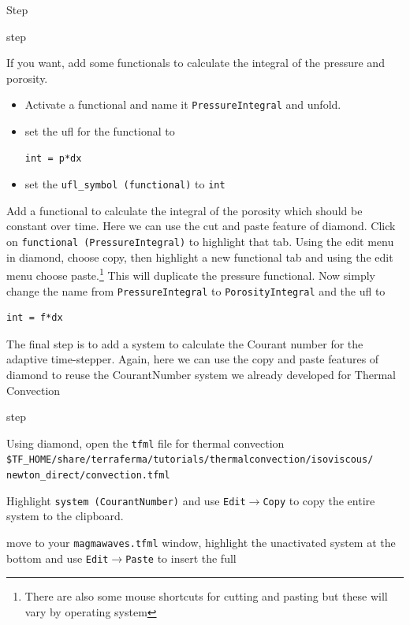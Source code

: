 \begin{steps}{Step}
\begin{steps}{step}
  \item If you want, add some functionals to calculate the integral of the
    pressure and porosity.
    \begin{itemize}
    \item Activate a functional and name it \texttt{PressureIntegral}
      and unfold.
    \item set the ufl for the functional to
      \begin{lstlisting}[style=ufl]
        int = p*dx
      \end{lstlisting}
    \item set the \texttt{ufl\_symbol (functional)} to \texttt{int}
    \end{itemize}
  \item Add a functional to calculate the integral of the porosity
    which should be constant over time. Here we can use the cut and
    paste feature of diamond.  Click on \texttt{functional
      (PressureIntegral)} to highlight that tab.  Using the edit menu
    in diamond, choose copy,  then highlight a new functional tab and
    using the edit menu choose paste.\footnote{There are also some
      mouse shortcuts for cutting and pasting but these will vary by
      operating system}  This will duplicate the
    pressure functional.  Now simply change the name from
    \texttt{PressureIntegral} to \texttt{PorosityIntegral} and the ufl to
    \begin{lstlisting}[style=ufl]
        int = f*dx
     \end{lstlisting}
  \end{steps}
\item The final step is to add a system to calculate the Courant
  number for the adaptive time-stepper.  Again,  here we can use the
  copy and paste features of diamond to reuse the CourantNumber system
  we already developed for Thermal Convection
  \begin{steps}{step}  
  \item Using diamond, open the \texttt{tfml} file for
    thermal convection
    \texttt{\$TF\_HOME/share/terraferma/tutorials/thermalconvection/isoviscous/
      newton\_direct/convection.tfml}
  \item Highlight \texttt{system (CourantNumber)} and use
    \texttt{Edit}$\rightarrow$\texttt{Copy} to copy the entire system
    to the clipboard.
  \item move to your \texttt{magmawaves.tfml} window, highlight the
    unactivated system at the bottom and use
    \texttt{Edit}$\rightarrow$\texttt{Paste} to insert the full

\end{steps}
\end{steps}
